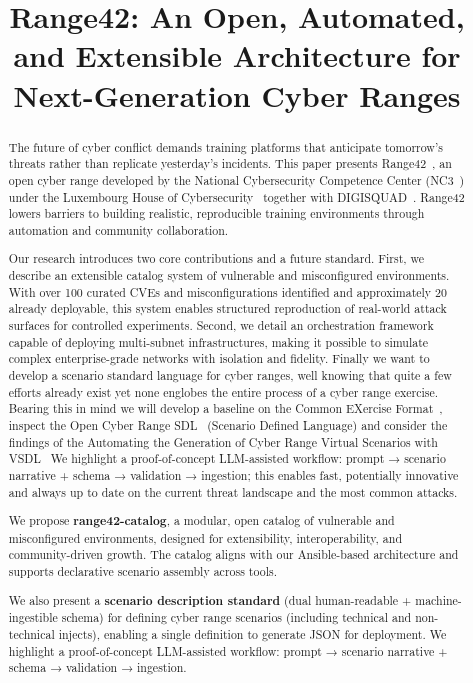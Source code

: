 \documentclass[11pt]{article}
\title{Range42: An Open, Automated, and Extensible Architecture for Next-Generation Cyber Ranges}
\author{} %
\date{}   %
\begin{document}
\maketitle

\begin{abstract}
The future of cyber conflict demands training platforms that anticipate tomorrow's threats rather than replicate yesterday's incidents. This paper presents Range42~\cite{range42}, an open cyber range developed by the National Cybersecurity Competence Center (NC3~\cite{NC3}) under the Luxembourg House of Cybersecurity~\cite{LHC} together with DIGISQUAD~\cite{DIGISQUAD}. Range42 lowers barriers to building realistic, reproducible training environments through automation and community collaboration.

Our research introduces two core contributions and a future standard. First, we describe an extensible catalog system of vulnerable and misconfigured environments. With over 100 curated CVEs and misconfigurations identified and approximately 20 already deployable, this system enables structured reproduction of real-world attack surfaces for controlled experiments. Second, we detail an orchestration framework capable of deploying multi-subnet infrastructures, making it possible to simulate complex enterprise-grade networks with isolation and fidelity. Finally we want to develop a scenario standard language for cyber ranges, well knowing that quite a few efforts already exist yet none englobes the entire process of a cyber range exercise. Bearing this in mind we will develop a baseline on the Common EXercise Format~\cite{cexf}, inspect the Open Cyber Range SDL~\cite{SDL} (Scenario Defined Language) and consider the findings of the Automating the Generation of Cyber Range Virtual Scenarios with VSDL~\cite{vsdl2022} We highlight a proof-of-concept LLM-assisted workflow: prompt → scenario narrative + schema → validation → ingestion; this enables fast, potentially innovative and always up to date on the current threat landscape and the most common attacks.

We propose \textbf{range42-catalog}, a modular, open catalog of vulnerable and misconfigured environments, designed for extensibility, interoperability, and community-driven growth. The catalog aligns with our Ansible-based architecture and supports declarative scenario assembly across tools.

We also present a \textbf{scenario description standard} (dual human-readable + machine-ingestible schema) for defining cyber range scenarios (including technical and non-technical injects), enabling a single definition to generate JSON for deployment. We highlight a proof-of-concept LLM-assisted workflow: prompt → scenario narrative + schema → validation → ingestion.


\end{abstract}
\end{document}
